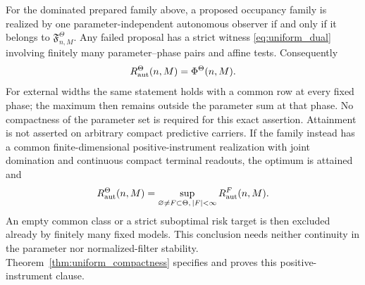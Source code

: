 \begin{theorem}\label{thm:uniform}
For the dominated prepared family above, a proposed occupancy family is realized by one parameter-independent autonomous observer if and only if it belongs to $\mathfrak F^\Theta_{n,M}$. Any failed proposal has a strict witness \eqref{eq:uniform_dual} involving finitely many parameter--phase pairs and affine tests. Consequently
\begin{equation}\label{eq:uniform_exact}
                  R^\Theta_{\mathrm{aut}}(n,M)=\Phi^\Theta(n,M).
\end{equation}
For external widths the same statement holds with a common row at every fixed phase; the maximum then remains outside the parameter sum at that phase. No compactness of the parameter set is required for this exact assertion. Attainment is not asserted on arbitrary compact predictive carriers. If the family instead has a common finite-dimensional positive-instrument realization with joint domination and continuous compact terminal readouts, the optimum is attained and
\begin{equation}\label{eq:finite_model_value}
 R^\Theta_{\mathrm{aut}}(n,M)=
 \sup_{\varnothing\ne F\subset\Theta,\,|F|<\infty}R^F_{\mathrm{aut}}(n,M).
\end{equation}
An empty common class or a strict suboptimal risk target is then excluded already by finitely many fixed models. This conclusion needs neither continuity in the parameter nor normalized-filter stability. Theorem~\ref{thm:uniform_compactness} specifies and proves this positive-instrument clause.


\end{theorem}
